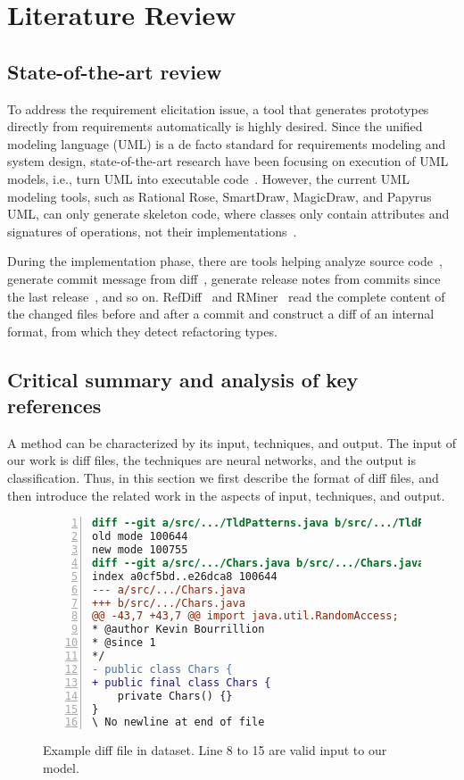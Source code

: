 \chapter{Literature Review}



\section{State-of-the-art review}

To address the requirement elicitation issue, a tool that generates prototypes directly from requirements automatically is highly desired.
Since the unified modeling language (UML) is a de facto standard for requirements modeling and system design,
state-of-the-art research have been focusing on execution of UML models, i.e., turn UML into executable code~\cite{ciccozzi2019execution}.
However, the current UML modeling tools, such as Rational Rose, SmartDraw, MagicDraw, and Papyrus UML, can only generate skeleton code, where classes only contain attributes and signatures of operations, not their implementations~\cite{regep2000using}.

During the implementation phase, there are tools helping analyze source code~\cite{morgachev2019detection,huo2016learning,gu2016deep},
generate commit message from diff~\cite{linares2015changescribe,buse2010automatically,huang2020learning},
generate release notes from commits since the last release~\cite{moreno2016arena}, and so on.
RefDiff~\cite{silva2020refdiff} and RMiner~\cite{tsantalis2018accurate} read the complete content of the changed files before and after a commit and construct a diff of an internal format, from which they detect refactoring types.


\section{Critical summary and analysis of key references}


A method can be characterized by its input, techniques, and output.
The input of our work is diff files, the techniques are neural networks, and the output is classification.
Thus, in this section we first describe the format of diff files, and then introduce the related work in the aspects of input, techniques, and output.


\begin{figure}[t]
\begin{lstlisting}[language=diff, breaklines=true, numbers=left, xleftmargin=2em]
diff --git a/src/.../TldPatterns.java b/src/.../TldPatterns.java
old mode 100644
new mode 100755
diff --git a/src/.../Chars.java b/src/.../Chars.java
index a0cf5bd..e26dca8 100644
--- a/src/.../Chars.java
+++ b/src/.../Chars.java
@@ -43,7 +43,7 @@ import java.util.RandomAccess;
* @author Kevin Bourrillion
* @since 1
*/
- public class Chars {
+ public final class Chars {
	private Chars() {}
}
\ No newline at end of file
\end{lstlisting}
\caption{Example diff file in dataset. Line 8 to 15 are valid input to our model.}
\label{fig:example-diff}
\end{figure}


